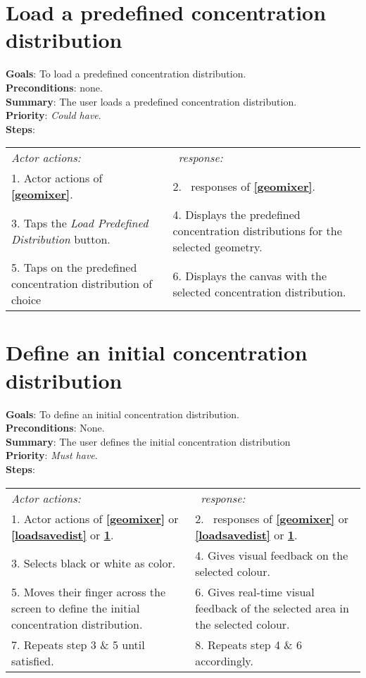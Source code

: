  \section{Load a predefined concentration distribution}
  \label{loadpreddist}
  \textbf{Goals}: To load a predefined concentration distribution.\\
  \textbf{Preconditions}: none.\\
  \textbf{Summary}: The user loads a predefined concentration distribution.\\
  \textbf{Priority}: \emph{Could have}.\\
  \textbf{Steps}: \\
  \begin{tabular}{ p{} p{} }
  	\emph{Actor actions:} & \emph{\projectname\ response:} \\
  	1. Actor actions of \textbf{\ref{geomixer}}. & 2. \projectname\ responses of \textbf{\ref{geomixer}}. \\
	3. Taps the \emph{Load Predefined Distribution} button. & 4. Displays the predefined concentration distributions for the selected geometry. \\
	5. Taps on the predefined concentration distribution of choice & 6. Displays the canvas with the selected concentration distribution. \\
  \end{tabular}
  
  \section{Define an initial concentration distribution}
  \label{initdist}
  \textbf{Goals}: To define an initial concentration distribution.\\
  \textbf{Preconditions}: None. \\ %
  \textbf{Summary}: The user defines the initial concentration distribution\\
  \textbf{Priority}: \emph{Must have}.\\
  \textbf{Steps}: \\
  \begin{tabular}{ p{} p{} }
  	\emph{Actor actions:} & \emph{\projectname\ response:} \\
  	1. Actor actions of \textbf{\ref{geomixer}} or \textbf{\ref{loadsavedist}} or \textbf{\ref{loadpreddist}}. & 2. \projectname\ responses of \textbf{\ref{geomixer}} or \textbf{\ref{loadsavedist}} or  \textbf{\ref{loadpreddist}}.\\
	3. Selects black or white as color. & 4. Gives visual feedback on the selected colour. \\
	5. Moves their finger across the screen to define the initial concentration distribution. & 6. Gives real-time visual feedback of the selected area in the selected colour.\\
      7. Repeats step 3 \& 5 until satisfied. & 8. Repeats step 4 \& 6 accordingly. \\
      \end{tabular}
      
